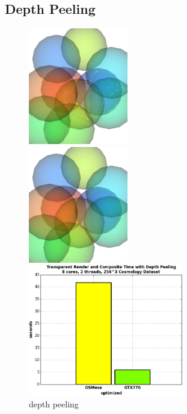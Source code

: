 \documentclass[a4paper,10pt]{report}
\begin{document}
\subsection{Depth Peeling}
\begin{figure}
\centering
\begin{minipage}{0.28\textwidth}
\begin{center}
 \includegraphics[height=2.0in]{./spheres_with_sort_crop.png}
 \end{center}
\end{minipage}
\begin{minipage}{0.28\textwidth}
 \begin{center}
 \includegraphics[height=2.0in]{./spheres_with_depth_peel_crop.png}
\end{center}
\end{minipage}
\begin{minipage}{0.3\textwidth}
 \begin{center}
 \includegraphics[height=2.25in]{./depth_peeling_time_cosmo.png}
\end{center}
\end{minipage}
\caption{depth peeling}
\label{fig:speedup_vpic}
\end{figure}
\end{document}
